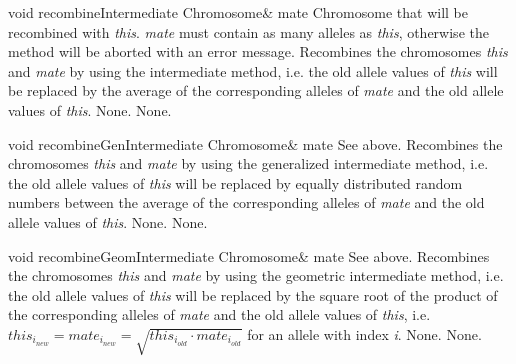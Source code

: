 \vspace*{4ex}

\setNormalInstance
\printMethodWithOneParam
{void}
{recombineIntermediate}
{Chromosome\&}
{mate}
{Chromosome that will be recombined with {\em this}. {\em mate} must contain
 as many alleles as {\em this}, otherwise the method will be aborted with
 an error message.}
{Recombines the chromosomes {\em this} and {\em mate} by using the
 intermediate method, i.e. the old allele values of {\em this}
 will be replaced by the average of the corresponding alleles of {\em mate}
 and the old allele values of {\em this}.}
{None.}
{None.}

\clearpage

\setNormalInstance
\printMethodWithOneParam
{void}
{recombineGenIntermediate}
{Chromosome\&}
{mate}
{See above.}
{Recombines the chromosomes {\em this} and {\em mate} by using the 
 generalized intermediate method, i.e. the old allele values of 
 {\em this}
 will be replaced by equally distributed random numbers between
 the average of the corresponding alleles of {\em mate}
 and the old allele values of {\em this}.}
{None.}
{None.}

\vspace*{4ex}

\setNormalInstance
\printMethodWithOneParam
{void}
{recombineGeomIntermediate}
{Chromosome\&}
{mate}
{See above.}
{Recombines the chromosomes {\em this} and {\em mate} by using the 
 geometric intermediate method, i.e. the old allele values of 
 {\em this}
 will be replaced by the square root of the product of the corresponding 
alleles of {\em mate}
 and the old allele values of {\em this}, i.e.
 $this_{i_{new}} = mate_{i_{new}} = \sqrt{this_{i_{old}} \cdot 
    mate_{i_{old}}}$ 
    for an allele with index {\em i}.}
{None.}
{None.}
